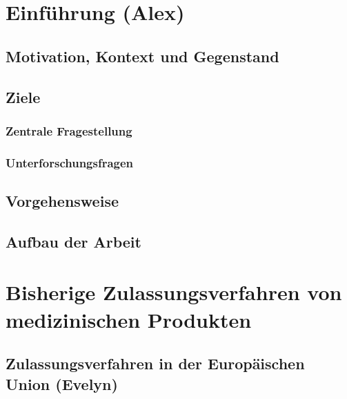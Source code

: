 \documentclass[a4paper, 11pt]{article}
\begin{document}
    \pagestyle{empty}
    
    \newpage
    
        
    \newpage
    \hypertarget{contents}{}
    \tableofcontents

    \newpage
    \pagestyle{fancy}
    \section{Einführung \small{(Alex)}}\label{sec:introduction}
        
		\subsection{Motivation, Kontext und Gegenstand}\label{sec:motivationcontext}
			
		\subsection{Ziele}\label{sec:goals}
			
			\subsubsection{Zentrale Fragestellung}\label{sec:questions}
				
			\subsubsection{Unterforschungsfragen}\label{sec:hypotheses}
				

		\subsection{Vorgehensweise}\label{sec:procedure}
			
			\subsection{Aufbau der Arbeit}\label{sec:structure}
				

	\newpage
	\section{Bisherige Zulassungsverfahren von medizinischen Produkten}\label{sec:admission}
		
		\subsection{Zulassungsverfahren in der Europäischen Union \small{(Evelyn)}}\label{sec:europe}
			
\end{document}
